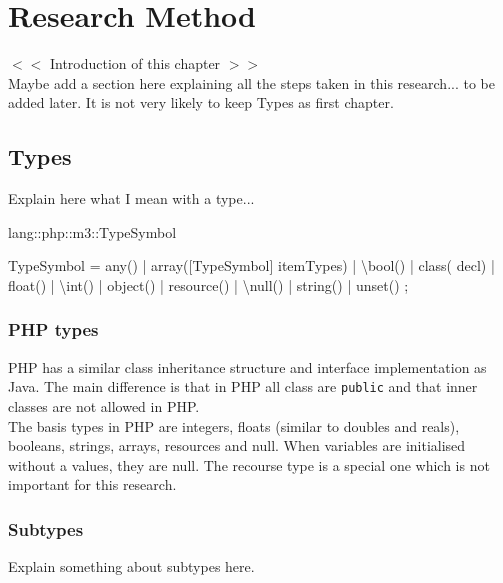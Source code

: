 \documentclass[../main.tex]{subfiles}
\begin{document}
    \chapter{Research Method}\label{chap:research_method}
    $<<$ Introduction of this chapter $>>$
    \\
    Maybe add a section here explaining all the steps taken in this research... to be added later.
    It is not very likely to keep Types as first chapter.
    \blindtext %
    
    \section{Types}
    Explain here what I mean with a type...
    
    \begin{rascal}
 lang::php::m3::TypeSymbol

 TypeSymbol
  = any()
  | array([TypeSymbol] itemTypes)
  | \textbackslash{}bool()
  | class( decl)
  | float()
  | \textbackslash{}int()
  | object()
  | resource()
  | \textbackslash{}null()
  | string()
  | unset()
  ; 
    \end{rascal}
    
    \subsection{PHP types}
    PHP has a similar class inheritance structure and interface implementation as Java.
    The main difference is that in PHP all class are \texttt{public} and that inner classes are not allowed in PHP. 
    \\
    The basis types in PHP are integers, floats (similar to doubles and reals), booleans, strings, arrays, resources and null.
    When variables are initialised without a values, they are null. The recourse type is a special one which is not important for this research.
 
    \subsection{Subtypes}
    
    Explain something about subtypes here.

    \blindtext %
    
\end{document}
